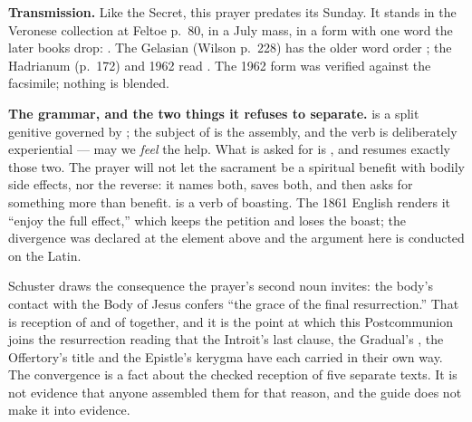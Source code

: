 \textbf{Transmission.} Like the Secret, this prayer predates its Sunday. It
stands in the Veronese collection at Feltoe p.~80, in a July mass, in a form
with one word the later books drop: . The Gelasian (Wilson p.~228) has the
older word order ; the Hadrianum
(p.~172) and 1962 read . The 1962 form was verified
against the facsimile; nothing is blended.

\textbf{The grammar, and the two things it refuses to separate.}
 is a split genitive governed by
; the subject of  is the assembly, and the
verb is deliberately experiential --- may we \textit{feel} the help. What is
asked for is , and 
resumes exactly those two. The prayer will not let the sacrament be a
spiritual benefit with bodily side effects, nor the reverse: it names both,
saves both, and then asks for something more than benefit.  is
a verb of boasting. The 1861 English renders it ``enjoy the full effect,''
which keeps the petition and loses the boast; the divergence was declared at
the element above and the argument here is conducted on the Latin.

\begin{witnessnote}
Schuster draws the consequence the prayer's second noun invites: the body's
contact with the Body of Jesus confers ``the grace of the final
resurrection.'' That is reception of  and of  together, and it is the point at which this Postcommunion joins the
resurrection reading that the Introit's last clause, the Gradual's
, the Offertory's title and the Epistle's kerygma have each
carried in their own way. The convergence is a fact about the checked
reception of five separate texts. It is not evidence that anyone assembled
them for that reason, and the guide does not make it into evidence.
\end{witnessnote}
